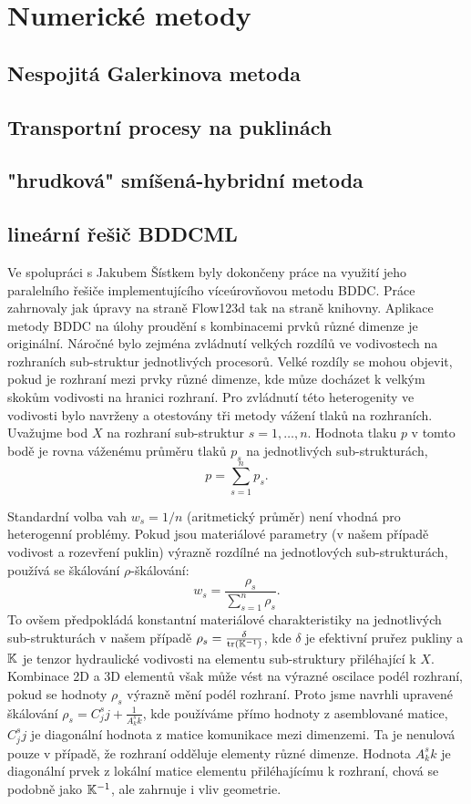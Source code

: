 \documentclass[11pt]{report}
\begin{document}
\section{Numerické metody}
\subsection{Nespojitá Galerkinova metoda}
\subsection{Transportní procesy na puklinách}
\subsection{"hrudková" smíšená-hybridní metoda}
\subsection{lineární řešič BDDCML}
Ve spolupráci s Jakubem Šístkem byly dokončeny práce na využití jeho 
paralelního řešiče implementujícího víceúrovňovou metodu BDDC. Práce zahrnovaly 
jak úpravy na straně Flow123d tak na straně knihovny. Aplikace metody BDDC na 
úlohy proudění s kombinacemi prvků různé dimenze je originální. Náročné bylo 
zejména zvládnutí velkých rozdílů ve vodivostech na rozhraních sub-struktur 
jednotlivých procesorů. Velké rozdíly se mohou objevit, pokud je rozhraní mezi 
prvky různé dimenze, kde můze docházet k velkým skokům vodivosti na hranici 
rozhraní. Pro zvládnutí této heterogenity ve vodivosti bylo navrženy a 
otestovány tři metody vážení tlaků na rozhraních. Uvažujme bod $X$ na rozhraní 
sub-struktur $s=1,\dots,n$. Hodnota tlaku $p$ v tomto bodě je rovna váženému 
průměru tlaků $p_s$ na jednotlivých sub-strukturách, 
\[
    p = \sum_{s=1}^n p_s. 
\]

Standardní volba vah $w_s=1/n$ (aritmetický průměr) není vhodná pro heterogenní 
problémy. Pokud jsou materiálové parametry (v našem případě vodivost a 
rozevření puklin) výrazně rozdílné na jednotlových sub-strukturách, používá se 
škálování $\rho$-škálování:
\[
    w_s=\frac{\rho_s}{\sum_{s=1}^n \rho_s}.
\]
To ovšem předpokládá konstantní materiálové charakteristiky na jednotlivých 
sub-strukturách v našem případě $\rho_s=\frac{\delta}{\text{tr}({\mathbb{K}}^{-1})}$, 
kde $\delta$ je efektivní pruřez pukliny a ${\mathbb{K}}$ je tenzor 
hydraulické vodivosti na elementu sub-struktury přiléhající k $X$. Kombinace 2D 
a 3D elementů však může vést na výrazné oscilace podél rozhraní, pokud se 
hodnoty $\rho_s$ výrazně mění podél rozhraní. Proto jsme navrhli upravené 
škálování $\rho_s=C^s_jj + \frac{1}{A^s_kk}$, kde používáme přímo hodnoty z 
asemblované matice, $C^s_jj$ je diagonální hodnota z matice komunikace mezi 
dimenzemi. Ta je nenulová pouze v případě, že rozhraní odděluje elementy různé 
dimenze. Hodnota $A^s_kk$ je diagonální prvek z lokální matice elementu 
přiléhajícímu k rozhraní, chová se podobně jako ${\mathbb{K}}^{-1}$, ale zahrnuje i 
vliv geometrie. 
\end{document}
